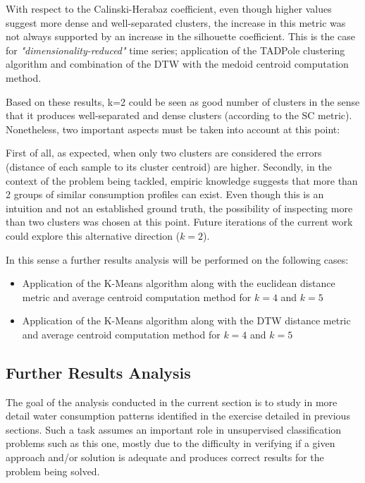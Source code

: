 \documentclass[9pt,journal,compsoc]{IEEEtran}
\begin{document}
With respect to the Calinski-Herabaz coefficient, even though higher values suggest more dense and well-separated clusters, the increase in this metric was not always supported by an increase in the silhouette coefficient. This is the case for \emph{"dimensionality-reduced"} time series; application of the TADPole clustering algorithm and combination of the DTW with the medoid centroid computation method.

Based on these results, k=2 could be seen as good number of clusters in the sense that it produces well-separated and dense clusters (according to the SC metric). Nonetheless, two important aspects must be taken into account at this point:

First of all, as expected, when only two clusters are considered the errors (distance of each sample to its cluster centroid) are higher. Secondly, in the context of the problem being tackled, empiric knowledge suggests that more than 2 groups of similar consumption profiles can exist. Even though this is an intuition and not an established ground truth, the possibility of inspecting more than two clusters was chosen at this point. Future iterations of the current work could explore this alternative direction ($k = 2$).

In this sense a further results analysis will be performed on the following cases:

\begin{itemize}
	\item Application of the K-Means algorithm along with the euclidean distance metric and average centroid computation method for $k = 4$ and $k = 5$
	
	\item Application of the K-Means algorithm along with the DTW distance metric and average centroid computation method for $k = 4$ and $k = 5$
\end{itemize}

\subsection{Further Results Analysis}

The goal of the analysis conducted in the current section is to study in more detail water consumption patterns identified in the exercise detailed in previous sections. Such a task assumes an important role in unsupervised classification problems such as this one, mostly due to the difficulty in verifying if a given approach and/or solution is adequate and produces correct results for the problem being solved.
\end{document}
